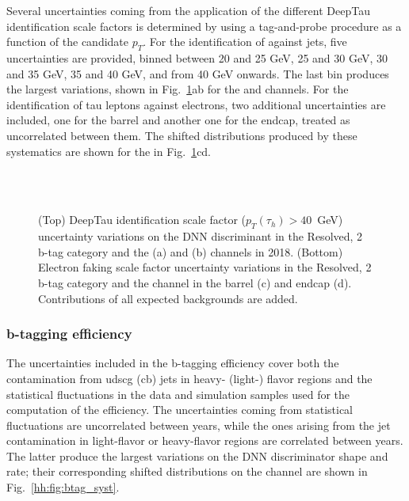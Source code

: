 \documentclass[../main.tex]{subfiles}
\begin{document}
Several uncertainties coming from the application of the different DeepTau identification scale factors is determined by using a tag-and-probe procedure as a function of the \tauh{} candidate $p_T$. For the identification of \tauh{} against jets, five uncertainties are provided, binned between 20 and 25 GeV, 25 and 30 GeV, 30 and 35 GeV, 35 and 40 GeV, and from 40 GeV onwards. The last bin produces the largest variations, shown in Fig.~\ref{hh:fig:deeptau_syst}ab for the \taumu\tauh{} and \tauh\tauh{} channels. For the identification of tau leptons against electrons, two additional uncertainties are included, one for the barrel and another one for the endcap, treated as uncorrelated between them. The shifted distributions produced by these systematics are shown for the \taue\tauh{} in Fig.~\ref{hh:fig:deeptau_syst}cd.


\begin{figure}[h!]
\begin{center}
\\
\\
\end{center}
\caption[\deeptau{} uncertainties]{(Top) DeepTau identification scale factor ($p_T(\tau_h)>40$~GeV) uncertainty variations on the DNN discriminant in the Resolved, 2 b-tag category and the \taumu\tauh{} (a) and \tauh\tauh{} (b) channels in 2018. (Bottom) Electron faking \tauh{} scale factor uncertainty variations in the Resolved, 2 b-tag category and the \taue\tauh{} channel in the barrel (c) and endcap (d). Contributions of all expected backgrounds are added.}
\label{hh:fig:deeptau_syst}
\end{figure}

\subsubsection*{b-tagging efficiency}

The uncertainties included in the b-tagging efficiency cover both the contamination from udscg (cb) jets in heavy- (light-) flavor regions and the statistical fluctuations in the data and simulation samples used for the computation of the efficiency. The uncertainties coming from statistical fluctuations are uncorrelated between years, while the ones arising from the jet contamination in light-flavor or heavy-flavor regions are correlated between years. The latter produce the largest variations on the DNN discriminator shape and rate; their corresponding shifted distributions on the \tauh\tauh{} channel are shown in Fig.~\ref{hh:fig:btag_syst}.
\end{document}
